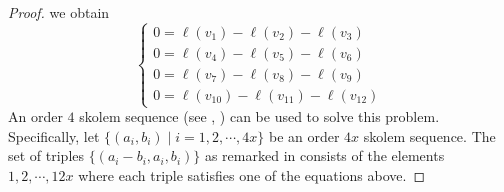 \begin{proof}
    we obtain
    \[
    \begin{cases}
        0 = \ell(v_1) - \ell(v_2) - \ell(v_3) \\
        0 = \ell(v_4) - \ell(v_5) - \ell(v_6) \\
        0 = \ell(v_7) - \ell(v_8) - \ell(v_9) \\
        0 = \ell(v_{10}) - \ell(v_{11}) - \ell(v_{12})
    \end{cases}
    \]
    An order \(4\) skolem sequence (see \cite{skolemCertainDistributionsIntegers1957}, \cite{skolemRemarksTripleSystems1958}) can be used to solve this problem.
    Specifically, let \(\{(a_i, b_i) \mid i = 1,2,\cdots, 4x\}\) be an order \(4x\) skolem sequence.
    The set of triples \(\{(a_i - b_i, a_i, b_i)\}\) as remarked in \cite{skolemRemarksTripleSystems1958}
    consists of the elements \(1, 2, \cdots, 12x\) where
    each triple satisfies one of the equations above.
\end{proof}


